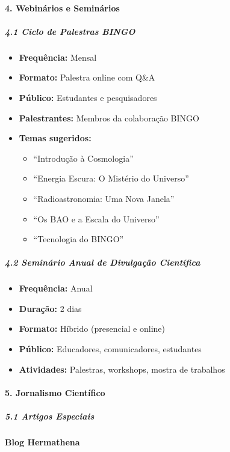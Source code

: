 \bigskip

\paragraph{4. Webinários e Seminários}

\subparagraph{4.1 Ciclo de Palestras BINGO}

\begin{itemize}
\item \textbf{Frequência:} Mensal
\item \textbf{Formato:} Palestra online com Q\&A
\item \textbf{Público:} Estudantes e pesquisadores
\item \textbf{Palestrantes:} Membros da colaboração BINGO
\item \textbf{Temas sugeridos:}

\begin{itemize}
\item ``Introdução à Cosmologia''
\item ``Energia Escura: O Mistério do Universo''
\item ``Radioastronomia: Uma Nova Janela''
\item ``Os BAO e a Escala do Universo''
\item ``Tecnologia do BINGO''
\end{itemize}
\end{itemize}

\subparagraph{4.2 Seminário Anual de Divulgação Científica}

\begin{itemize}
\item \textbf{Frequência:} Anual
\item \textbf{Duração:} 2 dias
\item \textbf{Formato:} Híbrido (presencial e online)
\item \textbf{Público:} Educadores, comunicadores, estudantes
\item \textbf{Atividades:} Palestras, workshops, mostra de trabalhos
\end{itemize}

\paragraph{5. Jornalismo Científico}

\subparagraph{5.1 Artigos Especiais}

\textbf{Blog Hermathena}

